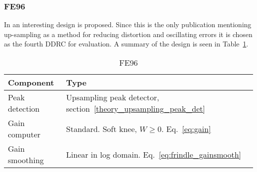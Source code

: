 \documentclass[../main2.tex]{subfiles}
\begin{document}
\subsubsection{FE96}
In \cite{frindle1996implementation} an interesting design is proposed. Since this is the only publication mentioning up-sampling as a method for reducing distortion and oscillating errors it is chosen as the fourth DDRC for evaluation. A summary of the design is seen in Table~\ref{tab:fe96}.
\begin{table}[h]
\begin{center}
\caption{FE96}
\label{tab:fe96}
\begin{tabular}{| l | l |}
	\hline
	Component & Type \\ \hline
	Peak detection & Upsampling peak detector, section~\ref{theory_upsampling_peak_det} \\
	Gain computer & Standard. Soft knee, $W\geq0$. Eq.~\eqref{eq:gain} \\
	Gain smoothing & Linear in log domain. Eq.~\eqref{eq:frindle_gainsmooth} \\
	\hline
\end{tabular}
\end{center}
\end{table}
\end{document}
